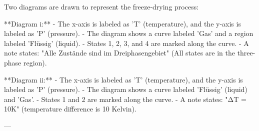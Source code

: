 Two diagrams are drawn to represent the freeze-drying process:  

**Diagram i:**  
- The x-axis is labeled as 'T' (temperature), and the y-axis is labeled as 'P' (pressure).  
- The diagram shows a curve labeled 'Gas' and a region labeled 'Flüssig' (liquid).  
- States 1, 2, 3, and 4 are marked along the curve.  
- A note states: "Alle Zustände sind im Dreiphasengebiet" (All states are in the three-phase region).  

**Diagram ii:**  
- The x-axis is labeled as 'T' (temperature), and the y-axis is labeled as 'P' (pressure).  
- The diagram shows a curve labeled 'Flüssig' (liquid) and 'Gas'.  
- States 1 and 2 are marked along the curve.  
- A note states: "ΔT = 10K" (temperature difference is 10 Kelvin).  

---